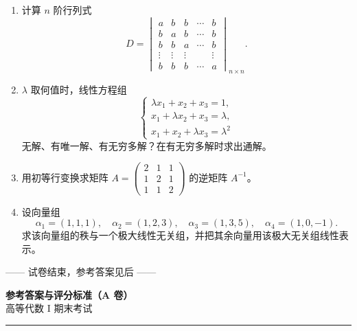 \documentclass[12pt]{ctexart}
\begin{document}
\begin{enumerate}[label=\arabic*.]
\item 计算 $n$ 阶行列式
  \[
  D=\begin{vmatrix}
  a & b & b & \cdots & b\\
  b & a & b & \cdots & b\\
  b & b & a & \cdots & b\\
  \vdots & \vdots & \vdots & & \vdots\\
  b & b & b & \cdots & a
  \end{vmatrix}_{n\times n}.
  \]

\item $\lambda$ 取何值时，线性方程组
  \[
  \begin{cases}
  \lambda x_1+x_2+x_3=1,\\
  x_1+\lambda x_2+x_3=\lambda,\\
  x_1+x_2+\lambda x_3=\lambda^{2}
  \end{cases}
  \]
  无解、有唯一解、有无穷多解？在有无穷多解时求出通解。

\item 用初等行变换求矩阵 $A=\begin{pmatrix}2&1&1\\ 1&2&1\\ 1&1&2\end{pmatrix}$ 的逆矩阵 $A^{-1}$。

\item 设向量组
  \[
  \alpha_1=(1,1,1),\quad \alpha_2=(1,2,3),\quad \alpha_3=(1,3,5),\quad \alpha_4=(1,0,-1).
  \]
  求该向量组的秩与一个极大线性无关组，并把其余向量用该极大无关组线性表示。
\end{enumerate}

\vspace{8pt}
\begin{center}\small —— 试卷结束，参考答案见后 ——\end{center}

\clearpage
\begin{center}
  {\Large\bfseries 参考答案与评分标准（A 卷）}\\[2pt]
  {\small 高等代数 I 期末考试}
\end{center}
\vspace{6pt}\hrule\vspace{12pt}
\end{document}

